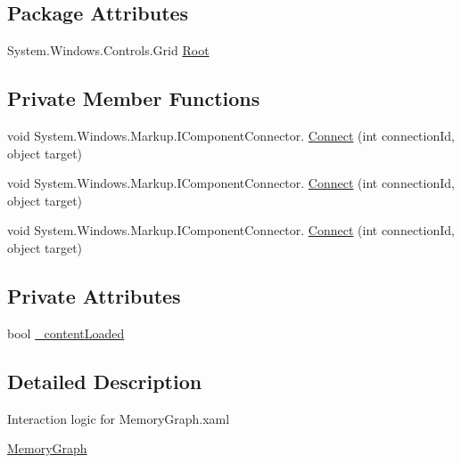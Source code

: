 \subsection*{Package Attributes}
\begin{DoxyCompactItemize}
\item 
System.\+Windows.\+Controls.\+Grid \hyperlink{class_c_p_u___o_s___simulator_1_1_controls_1_1_graphs_1_1_memory_graph_a8d150d903f462523d77188c9a04ea5c3}{Root}
\end{DoxyCompactItemize}
\subsection*{Private Member Functions}
\begin{DoxyCompactItemize}
\item 
void System.\+Windows.\+Markup.\+I\+Component\+Connector. \hyperlink{class_c_p_u___o_s___simulator_1_1_controls_1_1_graphs_1_1_memory_graph_afbdb45aa126b42b49cdf0c1252a33181}{Connect} (int connection\+Id, object target)
\item 
void System.\+Windows.\+Markup.\+I\+Component\+Connector. \hyperlink{class_c_p_u___o_s___simulator_1_1_controls_1_1_graphs_1_1_memory_graph_afbdb45aa126b42b49cdf0c1252a33181}{Connect} (int connection\+Id, object target)
\item 
void System.\+Windows.\+Markup.\+I\+Component\+Connector. \hyperlink{class_c_p_u___o_s___simulator_1_1_controls_1_1_graphs_1_1_memory_graph_afbdb45aa126b42b49cdf0c1252a33181}{Connect} (int connection\+Id, object target)
\end{DoxyCompactItemize}
\subsection*{Private Attributes}
\begin{DoxyCompactItemize}
\item 
bool \hyperlink{class_c_p_u___o_s___simulator_1_1_controls_1_1_graphs_1_1_memory_graph_a1abe1c0b96a7194ab7f367b2635ab562}{\+\_\+content\+Loaded}
\end{DoxyCompactItemize}


\subsection{Detailed Description}
Interaction logic for Memory\+Graph.\+xaml 

\hyperlink{class_c_p_u___o_s___simulator_1_1_controls_1_1_graphs_1_1_memory_graph}{Memory\+Graph} 

